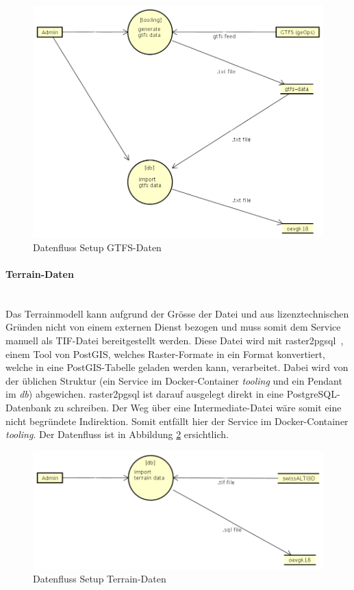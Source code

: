 \begin{figure}[ht]
    \centering
    \includegraphics[width=0.8\linewidth]{projectdoc/img/dataflow-docker-setup-gtfs-data.png}
    \caption[Datenfluss Setup GTFS-Daten]{Datenfluss Setup GTFS-Daten}
    \label{fig:dataflow-docker-setup-gtfs-data}
\end{figure}

\paragraph{Terrain-Daten}~\\
Das Terrainmodell kann aufgrund der Grösse der Datei und aus lizenztechnischen Gründen nicht von einem externen Dienst bezogen und muss somit dem Service manuell als TIF-Datei bereitgestellt werden.
Diese Datei wird mit raster2pgsql~\cite{raster2pgsql}, einem Tool von PostGIS, welches Raster-Formate in ein Format konvertiert, welche in eine PostGIS-Tabelle geladen werden kann, verarbeitet.
Dabei wird von der üblichen Struktur (ein Service im Docker-Container \emph{tooling} und ein Pendant im \emph{db}) abgewichen.
raster2pgsql ist darauf ausgelegt direkt in eine PostgreSQL-Datenbank zu schreiben.
Der Weg über eine Intermediate-Datei wäre somit eine nicht begründete Indirektion.
Somit entfällt hier der Service im Docker-Container \emph{tooling}.
Der Datenfluss ist in Abbildung \ref{fig:dataflow-docker-setup-terrain-data} ersichtlich.

\begin{figure}[ht]
    \centering
    \includegraphics[width=0.8\linewidth]{projectdoc/img/dataflow-docker-setup-terrain-data.png}
    \caption[Datenfluss Setup Terrain-Daten]{Datenfluss Setup Terrain-Daten}
    \label{fig:dataflow-docker-setup-terrain-data}
\end{figure}

